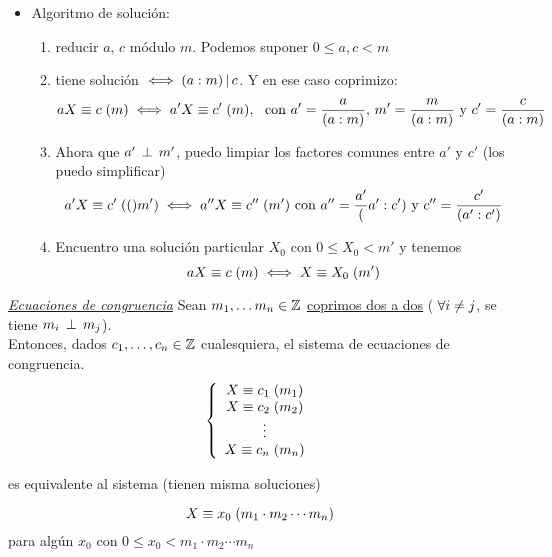 \documentclass[12pt,a4paper, spanish]{article}
\begin{document}
\begin{itemize}
	\item Algoritmo de solución:
	      \begin{enumerate}[label=\arabic*)]
		      \item reducir $a,\, c$ módulo $m$. Podemos suponer $0 \leq a, c < m$
		      \item tiene solución $\sisolosi (a:m) \divide c$. Y en ese caso coprimizo:
		            \[
			            \congruencia{aX}{c}{m} \sisolosi \congruencia{a'X}{c'}{m},\ \text{ con } a' = \frac{a}{(a:m)},\, m' = \frac{m}{(a:m)} \text{ y } c' = \frac{c}{(a:m)}
		            \]
		      \item   Ahora que $a' \cop m'$, puedo limpiar los factores comunes entre $a'$ y $c'$ (los puedo simplificar)
		            \[
			            \congruencia{a'X}{c'}(m') \sisolosi \congruencia{a''X}{c''}{m'} \text{ con } a'' = \frac{a'}(a':c') \text{ y } c'' = \frac{c'}{(a':c')}
		            \]
		      \item Encuentro una solución particular $X_0$ con $ 0\leq X_0 < m'$ y tenemos
		            \[
			            \congruencia{aX}{c}{m} \sisolosi \congruencia{X}{X_0}{m'}
		            \]
	      \end{enumerate}

\end{itemize}

\textit\underline{Ecuaciones de congruencia}
Sean $m_1,\dots m_n \en \enteros$ \underline{coprimos dos a dos} ($\paratodo i \distinto j$, se tiene $m_i \cop m_j$). \\
Entonces, dados $c_1,\dots, c_n \en \enteros$ cualesquiera, el sistema de ecuaciones de congruencia.
\[
	\llave{c}{
		\congruencia{X}{c_1}{m_1}\\
		\congruencia{X}{c_2}{m_2}\\
		\vdots\\
		\congruencia{X}{c_n}{m_n}
	}
\]

es equivalente al sistema (tienen misma soluciones)

\[
	\congruencia{X}{x_0}{m_1\cdot m_2 \cdots m_n}
\]
para algún $x_0$ con $0\leq x_0 < m_1\cdot m_2 \cdots m_n$
\end{document}

